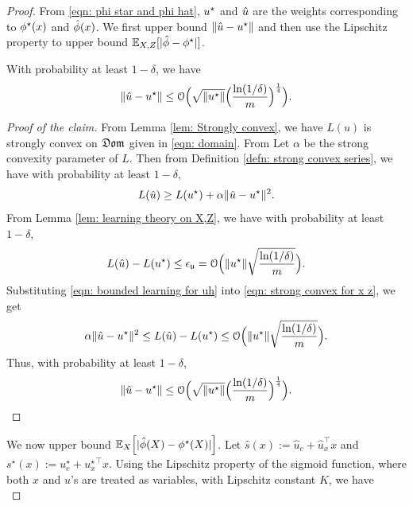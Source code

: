 \begin{proof}
    From \eqref{eqn: phi star and phi hat}, $u^\star$ and $\hat{u}$ are the weights corresponding to $\phi^\star(x)$ and $\hat{\phi}(x)$. We first upper bound $\|\hat{u} - u^\star\|$ and then use the Lipschitz property to upper bound $\mathbb{E}_{X,Z}[|\hat{\phi} - \phi^\star|]$.

    \begin{klaim}
    With probability at least $1-\delta$, we have
\begin{equation*}
    \|\hat{u} - u^\star\| \leq \mathcal{O}\Big(\sqrt{\|u^\star\|}\Big(\frac{\ln(1/\delta)}{m}\Big)^{\frac{1}{4}}\Big).
\end{equation*}
\end{klaim}

\begin{proof}[Proof of the claim]
From Lemma \ref{lem: Strongly convex}, we have $L(u)$ is strongly convex on $\mathfrak{Dom}$ given in \eqref{eqn: domain}. From Let $\alpha$ be the strong convexity parameter of $L$. Then from Definition \ref{defn: strong convex series}, we have with probability at least $1-\delta$,
    \begin{equation}\label{eqn: strong convex for x z}
        L(\hat{u}) \geq L(u^\star) + \alpha\|\hat{u}-u^\star\|^2.
    \end{equation}
From Lemma \ref{lem: learning theory on X,Z}, we have with probability at least $1-\delta$,
\begin{equation}\label{eqn: bounded learning for uh}
    L(\hat{u}) - L(u^\star) \leq \epsilon_{\mathfrak{u}} = \mathcal{O}\Big(\|u^\star\|\sqrt{\frac{\ln(1/\delta)}{m}}\Big).
\end{equation}
Substituting \eqref{eqn: bounded learning for uh} into \eqref{eqn: strong convex for x z}, we get
\begin{equation*}
    \alpha\|\hat{u}-u^\star\|^2 \leq L(\hat{u}) - L(u^\star) \leq \mathcal{O}\Big(\|u^\star\|\sqrt{\frac{\ln(1/\delta)}{m}}\Big).
\end{equation*}
Thus, with probability at least $1-\delta$,
\begin{equation*}
    \|\hat{u} - u^\star\| \leq \mathcal{O}\Big(\sqrt{\|u^\star\|}\Big(\frac{\ln(1/\delta)}{m}\Big)^{\frac{1}{4}}\Big).
\end{equation*}
\end{proof}
We now upper bound $\mathbb{E}_{X}\Big[|\hat{\phi}(X) - \phi^\star(X)|\Big]$. Let $\hat{s}(x) := \hat{u}_c + \hat{u}_x^\top x$ and $s^\star(x) := u^\star_c + {u^\star_x}^\top x$. Using the Lipschitz property of the sigmoid function, where both $x$ and $u$'s are treated as variables, with Lipschitz constant $K$, we have
    \begin{equation*}

\end{equation*}
\end{proof}
